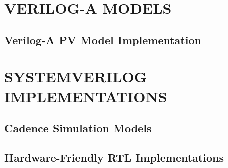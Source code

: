 \documentclass[a4paper,oneside,12pt]{report}
\numberwithin{equation}{chapter}
\begin{document}
\chapter{VERILOG-A MODELS}
\label{app:veriloga}

\section{Verilog-A PV Model Implementation}


\chapter{SYSTEMVERILOG IMPLEMENTATIONS}
\label{app:systemverilog}
\section{Cadence Simulation Models}





\section{Hardware-Friendly RTL Implementations}










\nocite{*}


\end{document}
